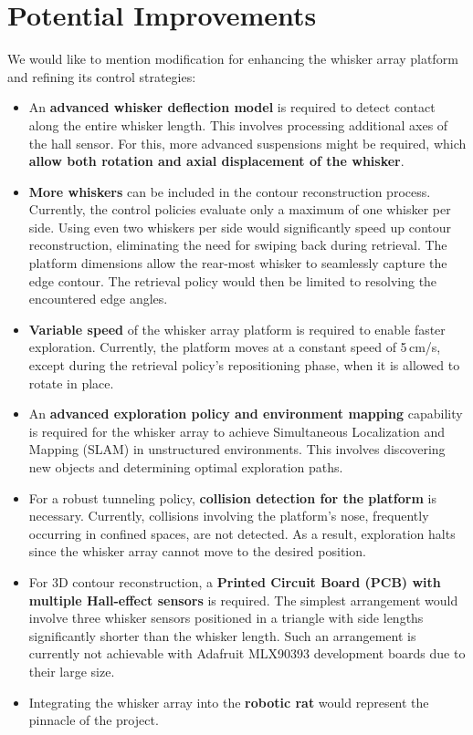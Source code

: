 \section{Potential Improvements}
We would like to mention modification for enhancing the whisker array platform and refining its control strategies:
\begin{itemize}
    \item An \textbf{advanced whisker deflection model} is required to detect contact along the entire whisker length.
    This involves processing additional axes of the hall sensor.
    For this, more advanced suspensions might be required, which \textbf{allow both rotation and axial displacement of the whisker}.

    \item \textbf{More whiskers} can be included in the contour reconstruction process.
    Currently, the control policies evaluate only a maximum of one whisker per side.
    Using even two whiskers per side would significantly speed up contour reconstruction, eliminating the need for swiping back during retrieval.
    The platform dimensions allow the rear-most whisker to seamlessly capture the edge contour.
    The retrieval policy would then be limited to resolving the encountered edge angles.

    \item \textbf{Variable speed} of the whisker array platform is required to enable faster exploration.
    Currently, the platform moves at a constant speed of 5\,cm/s, except during the retrieval policy's repositioning phase, when it is allowed to rotate in place.

    \item An \textbf{advanced exploration policy and environment mapping} capability is required for the whisker array to achieve Simultaneous Localization and Mapping (SLAM) in unstructured environments.
    This involves discovering new objects and determining optimal exploration paths.

    \item For a robust tunneling policy, \textbf{collision detection for the platform} is necessary.
    Currently, collisions involving the platform's nose, frequently occurring in confined spaces, are not detected.
    As a result, exploration halts since the whisker array cannot move to the desired position.

    \item For 3D contour reconstruction, a \textbf{Printed Circuit Board (PCB) with multiple Hall-effect sensors} is required.
    The simplest arrangement would involve three whisker sensors positioned in a triangle with side lengths significantly shorter than the whisker length.
    Such an arrangement is currently not achievable with Adafruit MLX90393 development boards due to their large size.

    \item Integrating the whisker array into the \textbf{robotic rat} would represent the pinnacle of the project.
\end{itemize}
